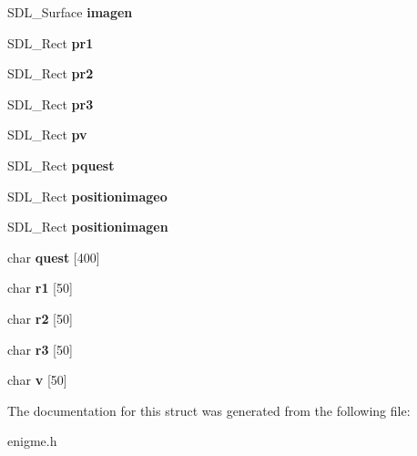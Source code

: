\begin{DoxyCompactItemize}
\item 
S\+D\+L\+\_\+\+Surface {\bfseries imagen}\hypertarget{structenigme_a05ed865cfa70da5d32cc9a717d6e2ad2}{}\label{structenigme_a05ed865cfa70da5d32cc9a717d6e2ad2}

\item 
S\+D\+L\+\_\+\+Rect {\bfseries pr1}\hypertarget{structenigme_a7eb8d641d45e4335b2c60b2a0c9037b8}{}\label{structenigme_a7eb8d641d45e4335b2c60b2a0c9037b8}

\item 
S\+D\+L\+\_\+\+Rect {\bfseries pr2}\hypertarget{structenigme_a89804b27f3bedda2234d71fb1ef88d5c}{}\label{structenigme_a89804b27f3bedda2234d71fb1ef88d5c}

\item 
S\+D\+L\+\_\+\+Rect {\bfseries pr3}\hypertarget{structenigme_ab6d9edd0a3901773473fd915ae966c4e}{}\label{structenigme_ab6d9edd0a3901773473fd915ae966c4e}

\item 
S\+D\+L\+\_\+\+Rect {\bfseries pv}\hypertarget{structenigme_a8519c7f181a11df67997195efb238b2c}{}\label{structenigme_a8519c7f181a11df67997195efb238b2c}

\item 
S\+D\+L\+\_\+\+Rect {\bfseries pquest}\hypertarget{structenigme_af12cfbe9e843ffbbd612c9bcc44921df}{}\label{structenigme_af12cfbe9e843ffbbd612c9bcc44921df}

\item 
S\+D\+L\+\_\+\+Rect {\bfseries positionimageo}\hypertarget{structenigme_a39d4b9366ba7e1b12c86b566f2cfdb99}{}\label{structenigme_a39d4b9366ba7e1b12c86b566f2cfdb99}

\item 
S\+D\+L\+\_\+\+Rect {\bfseries positionimagen}\hypertarget{structenigme_a0ec54db450f29c0170467f3718902f3c}{}\label{structenigme_a0ec54db450f29c0170467f3718902f3c}

\item 
char {\bfseries quest} \mbox{[}400\mbox{]}\hypertarget{structenigme_af85395df667ca31b4da0b9e45042658f}{}\label{structenigme_af85395df667ca31b4da0b9e45042658f}

\item 
char {\bfseries r1} \mbox{[}50\mbox{]}\hypertarget{structenigme_ab8ad9d1dd77fd405f1a4902afb556ba9}{}\label{structenigme_ab8ad9d1dd77fd405f1a4902afb556ba9}

\item 
char {\bfseries r2} \mbox{[}50\mbox{]}\hypertarget{structenigme_a69e2c99402f8552d706889398269fb02}{}\label{structenigme_a69e2c99402f8552d706889398269fb02}

\item 
char {\bfseries r3} \mbox{[}50\mbox{]}\hypertarget{structenigme_a0be499a1cab137aeaa3d66f50943519a}{}\label{structenigme_a0be499a1cab137aeaa3d66f50943519a}

\item 
char {\bfseries v} \mbox{[}50\mbox{]}\hypertarget{structenigme_a70d8de7b09d42617367d49020d219dc8}{}\label{structenigme_a70d8de7b09d42617367d49020d219dc8}

\end{DoxyCompactItemize}


The documentation for this struct was generated from the following file\+:\begin{DoxyCompactItemize}
\item 
enigme.\+h\end{DoxyCompactItemize}
